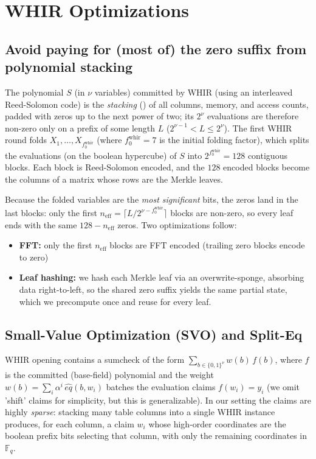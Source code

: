 \documentclass{article}
\theoremstyle{definition}
\newcommand{\Fq}{\mathbb F_q}
\begin{document}
\clearpage
\appendix

\section{WHIR Optimizations}


\subsection{Avoid paying for (most of) the zero suffix from polynomial stacking}\label{sec:zero-suffix}

The polynomial $S$ (in $\nu$ variables) committed by WHIR (using an interleaved Reed-Solomon code) is the \emph{stacking} () of all columns, memory, and access counts, padded with zeros up to the next power of two; its $2^\nu$ evaluations are therefore non-zero only on a prefix of some length $L$ ($2^{\nu - 1} < L \leq 2^\nu$). The first WHIR round folds $X_1, \ldots, X_{f_0^\text{whir}}$ (where $f_0^\text{whir} = 7$ is the initial folding factor), which splits the evaluations (on the boolean hypercube) of $S$ into $2^{f_0^\text{whir}} = 128$ contiguous blocks. Each block is Reed-Solomon encoded, and the $128$ encoded blocks become the columns of a matrix whose rows are the Merkle leaves.

Because the folded variables are the \emph{most significant} bits, the zeros land in the last blocks: only the first $n_\text{eff} = \lceil L / 2^{\nu - f_0^\text{whir}} \rceil$ blocks are non-zero, so every leaf ends with the same $128 - n_\text{eff}$ zeros. Two optimizations follow:

\begin{itemize}
    \item \textbf{FFT:} only the first $n_\text{eff}$ blocks are FFT encoded (trailing zero blocks encode to zero)
    \item \textbf{Leaf hashing:} we hash each Merkle leaf via an overwrite-sponge, absorbing data right-to-left, so the shared zero suffix yields the same partial state, which we precompute once and reuse for every leaf.
\end{itemize}

\subsection{Small-Value Optimization (SVO) and Split-Eq}\label{sec:svo}

WHIR opening contains a sumcheck of the form $\sum_{b \in \{0,1\}^\nu} w(b)\, f(b)$, where $f$ is the committed (base-field) polynomial and the weight $w(b) = \sum_i \alpha^i\, \hat{eq}(b, w_i)$ batches the evaluation claims $f(w_i) = y_i$ (we omit 'shift' claims for simplicity, but this is generalizable). In our setting the claims are highly \emph{sparse}: stacking many table columns into a single WHIR instance produces, for each column, a claim $w_i$ whose high-order coordinates are the boolean prefix bits selecting that column, with only the remaining coordinates in $\Fq$.
\end{document}
